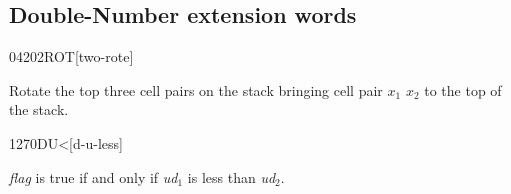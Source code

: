 \subsection{Double-Number extension words} %
\extended

\begin{newword}{0420}{2ROT}[two-rote]

	Rotate the top three cell pairs on the stack bringing cell pair
	$x_1$ $x_2$ to the top of the stack.
\end{newword}


\begin{newword}[DUless]{1270}{DU<}[d-u-less]

	\emph{flag} is true if and only if \emph{ud}$_1$ is less than
	\emph{ud}$_2$.
\end{newword}
